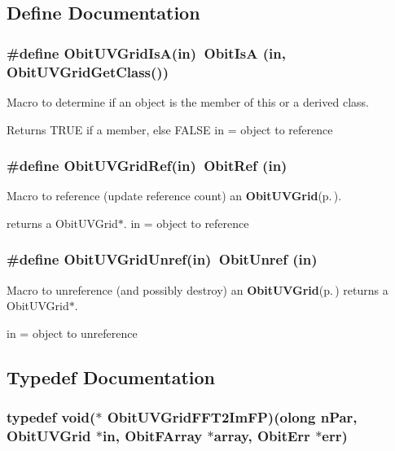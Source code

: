 \subsection{Define Documentation}
\subsubsection{\setlength{\rightskip}{0pt plus 5cm}\#define Obit\-UVGrid\-Is\-A(in)\ Obit\-Is\-A (in, Obit\-UVGrid\-Get\-Class())}\label{ObitUVGrid_8h_a2}


Macro to determine if an object is the member of this or a derived class. 

Returns TRUE if a member, else FALSE in = object to reference 
\subsubsection{\setlength{\rightskip}{0pt plus 5cm}\#define Obit\-UVGrid\-Ref(in)\ Obit\-Ref (in)}\label{ObitUVGrid_8h_a1}


Macro to reference (update reference count) an {\bf Obit\-UVGrid}{\rm (p.\,\pageref{structObitUVGrid})}. 

returns a Obit\-UVGrid$\ast$. in = object to reference 
\subsubsection{\setlength{\rightskip}{0pt plus 5cm}\#define Obit\-UVGrid\-Unref(in)\ Obit\-Unref (in)}\label{ObitUVGrid_8h_a0}


Macro to unreference (and possibly destroy) an {\bf Obit\-UVGrid}{\rm (p.\,\pageref{structObitUVGrid})} returns a Obit\-UVGrid$\ast$. 

in = object to unreference 

\subsection{Typedef Documentation}
\subsubsection{\setlength{\rightskip}{0pt plus 5cm}typedef void($\ast$ {\bf Obit\-UVGrid\-FFT2Im\-FP})({\bf olong} n\-Par, {\bf Obit\-UVGrid} $\ast$in, {\bf Obit\-FArray} $\ast$array, {\bf Obit\-Err} $\ast$err)}\label{ObitUVGrid_8h_a6}


